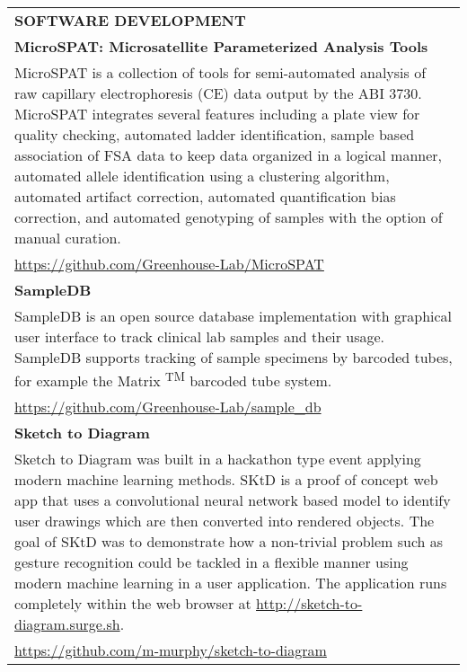 \begin{center}
    \begin{tabularx}{\textwidth}{X}
        {\large \textbf{SOFTWARE DEVELOPMENT}} \\
        \small \textbf{MicroSPAT: Microsatellite Parameterized Analysis Tools} \\
        \small MicroSPAT is a collection of tools for semi-automated analysis of raw capillary electrophoresis (CE) data output by the ABI 3730. MicroSPAT integrates several features including a plate view for quality checking, automated ladder identification, sample based association of FSA data to keep data organized in a logical manner, automated allele identification using a clustering algorithm, automated artifact correction, automated quantification bias correction, and automated genotyping of samples with the option of manual curation. \\
        \small \href{https://github.com/Greenhouse-Lab/MicroSPAT}{https://github.com/Greenhouse-Lab/MicroSPAT} \\
        \small \textbf{SampleDB} \\
        \small SampleDB is an open source database implementation with graphical user interface to track clinical lab samples and their usage. SampleDB supports tracking of sample specimens by barcoded tubes, for example the Matrix \textsuperscript{TM} barcoded tube system. \\
        \small \href{https://github.com/Greenhouse-Lab/sample_db}{https://github.com/Greenhouse-Lab/sample\_db} \\
        \small \textbf{Sketch to Diagram} \\
        \small Sketch to Diagram was built in a hackathon type event applying modern machine learning methods. SKtD is a proof of concept web app that uses a convolutional neural network based model to identify user drawings which are then converted into rendered objects. The goal of SKtD was to demonstrate how a non-trivial problem such as gesture recognition could be tackled in a flexible manner using modern machine learning in a user application. The application runs completely within the web browser at \href{http://sketch-to-diagram.surge.sh}{http://sketch-to-diagram.surge.sh}. \\
        \small \href{https://github.com/m-murphy/sketch-to-diagram}{https://github.com/m-murphy/sketch-to-diagram} \\
    \end{tabularx}
\end{center}